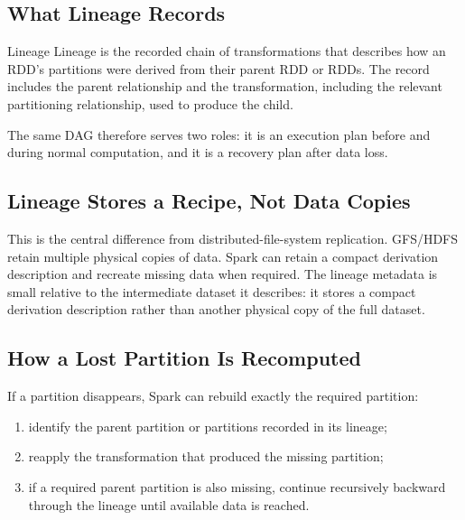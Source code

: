 \documentclass[11pt,a4paper,oneside]{book}
\begin{document}
\subsection{What Lineage Records}

\begin{definitionbox}{Lineage}
Lineage is the recorded chain of transformations that describes how an RDD's partitions were derived from their parent RDD or RDDs. The record includes the parent relationship and the transformation, including the relevant partitioning relationship, used to produce the child.
\end{definitionbox}

The same DAG therefore serves two roles: it is an execution plan before and during normal computation, and it is a recovery plan after data loss.

\subsection{Lineage Stores a Recipe, Not Data Copies}

This is the central difference from distributed-file-system replication. GFS/HDFS retain multiple physical copies of data. Spark can retain a compact derivation description and recreate missing data when required. The lineage metadata is small relative to the intermediate dataset it describes: it stores a compact derivation description rather than another physical copy of the full dataset.

\subsection{How a Lost Partition Is Recomputed}

If a partition disappears, Spark can rebuild exactly the required partition:

\begin{enumerate}
    \item identify the parent partition or partitions recorded in its lineage;
    \item reapply the transformation that produced the missing partition;
    \item if a required parent partition is also missing, continue recursively backward through the lineage until available data is reached.
\end{enumerate}
\end{document}
